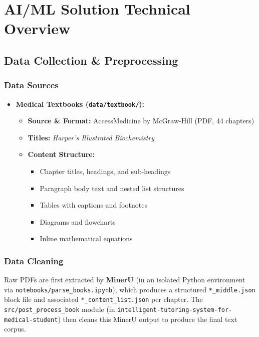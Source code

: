 \section*{AI/ML Solution Technical Overview}

\subsection*{Data Collection \& Preprocessing}

\subsubsection*{Data Sources}

\begin{itemize}
    \item \textbf{Medical Textbooks (\texttt{data/textbook/}):}
    \begin{itemize}
        \item \textbf{Source \& Format:} AccessMedicine by McGraw-Hill (PDF, 44 chapters)
        \item \textbf{Titles:} \textit{Harper's Illustrated Biochemistry}
        \item \textbf{Content Structure:}
        \begin{itemize}[itemsep=0pt,topsep=0pt]
            \item Chapter titles, headings, and sub-headings
            \item Paragraph body text and nested list structures
            \item Tables with captions and footnotes
            \item Diagrams and flowcharts
            \item Inline mathematical equations
        \end{itemize}
    \end{itemize}
\end{itemize}


\subsubsection*{Data Cleaning}

\begin{sloppypar}
\noindent Raw PDFs are first extracted by \textbf{MinerU} (in an isolated Python
environment via \texttt{notebooks/\allowbreak parse\_books.ipynb}), which produces a structured \texttt{*\_\allowbreak middle.json} block file and associated
\texttt{*\_\allowbreak content\_\allowbreak list.json} per chapter. The \texttt{src/\allowbreak post\_\allowbreak process\_\allowbreak book} module (in \texttt{intelligent-tutoring-system-\allowbreak for-medical-student}) then cleans
this MinerU output to produce the final text corpus.
\end{sloppypar}

